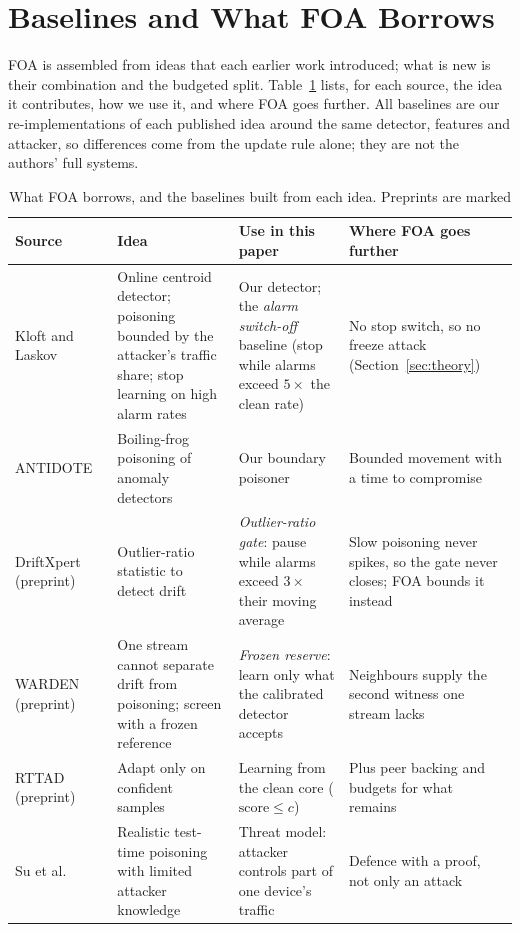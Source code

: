 \section{Baselines and What FOA Borrows}\label{sec:baselines}

FOA is assembled from ideas that each earlier work introduced; what is new is their combination and the
budgeted split. Table~\ref{tab:borrow} lists, for each source, the idea it contributes, how we use it, and
where FOA goes further. All baselines are our re-implementations of each published idea around the same
detector, features and attacker, so differences come from the update rule alone; they are not the
authors' full systems.

\begin{table}[t]
\caption{What FOA borrows, and the baselines built from each idea. Preprints are marked}\label{tab:borrow}
\centering\footnotesize
\begin{tabular}{@{}p{3.0cm}p{4.2cm}p{4.4cm}p{4.9cm}@{}}
\toprule
Source & Idea & Use in this paper & Where FOA goes further \\
\midrule
Kloft and Laskov~\cite{kloft} & Online centroid detector; poisoning bounded by the attacker's traffic share; stop learning on high alarm rates & Our detector; the \emph{alarm switch-off} baseline (stop while alarms exceed $5\times$ the clean rate) & No stop switch, so no freeze attack (Section~\ref{sec:theory}) \\
ANTIDOTE~\cite{antidote} & Boiling-frog poisoning of anomaly detectors & Our boundary poisoner & Bounded movement with a time to compromise \\
DriftXpert~\cite{driftxpert} (preprint) & Outlier-ratio statistic to detect drift & \emph{Outlier-ratio gate}: pause while alarms exceed $3\times$ their moving average & Slow poisoning never spikes, so the gate never closes; FOA bounds it instead \\
WARDEN~\cite{warden} (preprint) & One stream cannot separate drift from poisoning; screen with a frozen reference & \emph{Frozen reserve}: learn only what the calibrated detector accepts & Neighbours supply the second witness one stream lacks \\
RTTAD~\cite{rttad} (preprint) & Adapt only on confident samples & Learning from the clean core ($\mathrm{score}\le c$) & Plus peer backing and budgets for what remains \\
Su et al.~\cite{su2025tta} & Realistic test-time poisoning with limited attacker knowledge & Threat model: attacker controls part of one device's traffic & Defence with a proof, not only an attack \\

\end{tabular}
\end{table}

